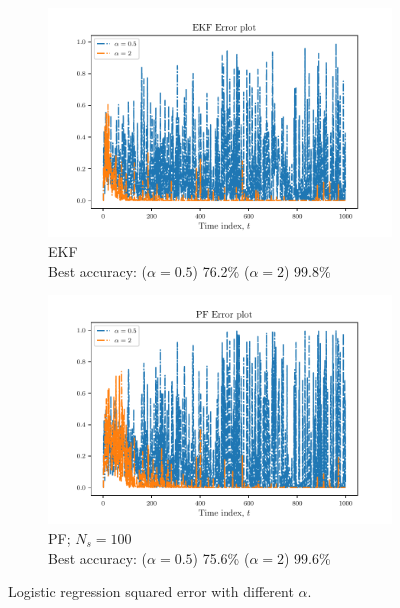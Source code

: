 \documentclass{article}
\begin{document}
\begin{figure}
    \begin{subfigure}{.5\textwidth}
            \includegraphics[width=\textwidth]{Figures/error_ekf-lr.pdf} 
            \caption{EKF\\
            Best accuracy: ($\alpha = 0.5$) 76.2\% ($\alpha = 2$) 99.8\%}
            \label{fig:error_ekf-lr}
    \end{subfigure}
    \begin{subfigure}{.5\textwidth}
        \includegraphics[width=\textwidth]{Figures/error_pf-lr.pdf} 
        \caption{PF; $N_s = 100$\\
        Best accuracy: ($\alpha = 0.5$) 75.6\% ($\alpha = 2$) 99.6\%}
        \label{fig:error_pf-lr}
    \end{subfigure}
    \caption{Logistic regression squared error with different $\alpha$.}
    \label{fig:error-lr}
\end{figure}
\end{document}
